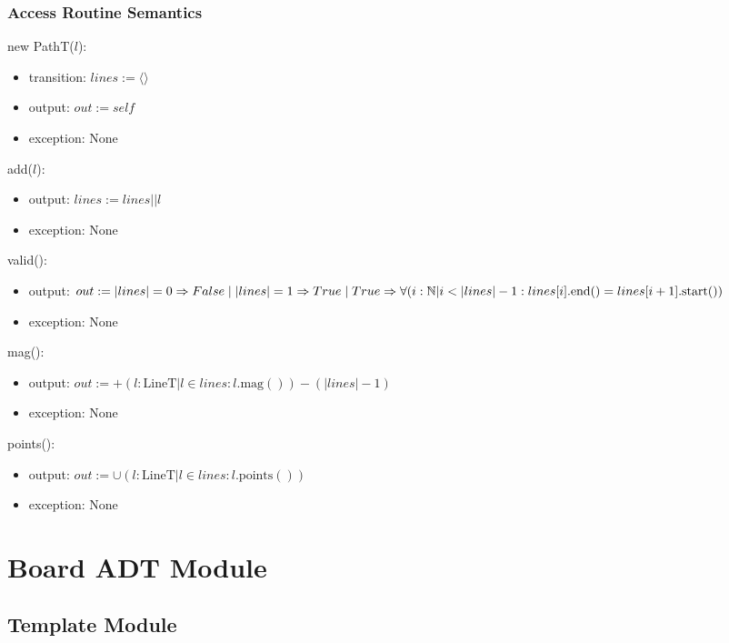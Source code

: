 \documentclass[12pt]{article}
\newcommand{\Implies}{\Rightarrow}
\begin{document}
\subsubsection* {Access Routine Semantics}

new PathT($l$):
\begin{itemize}
	\item transition: $lines := \langle \rangle$
	\item output: $out := \mathit{self}$
	\item exception: None
	
\end{itemize}

\noindent add($l$):
\begin{itemize}
	\item output: $lines := lines || l$
	\item exception: None
\end{itemize}

\noindent valid():
\begin{itemize}
	\item output: $out := |lines| = 0 \Implies False \mid |lines| = 1 \Implies True \mid \\
	True \Implies \forall (i : \mathbb{N} | i < |lines| - 1 : lines[i].\mbox{end}() = lines[i+1].\mbox{start}())$
	\item exception: None
\end{itemize}

\noindent mag():
\begin{itemize}
	\item output: $out := +(l : \mbox{LineT} | l \in lines: l.\mbox{mag}()) - (|lines| - 1)$
	\item exception: None
\end{itemize}

\noindent points():
\begin{itemize}
	\item output: $out := \cup (l : \mbox{LineT} | l \in lines: l.\mbox{points}())$
	\item exception: None
\end{itemize}

\newpage

\section* {Board ADT Module}

\subsection*{Template Module}
\end{document}

